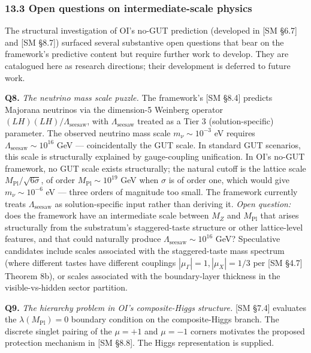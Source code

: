 \documentclass[
]{article}
\begin{document}
\hypertarget{open-questions-on-intermediate-scale-physics}{%
\subsubsection{13.3 Open questions on intermediate-scale
physics}\label{open-questions-on-intermediate-scale-physics}}

The structural investigation of OI's no-GUT prediction (developed in
{[}SM §6.7{]} and {[}SM §8.7{]}) surfaced several substantive open
questions that bear on the framework's predictive content but require
further work to develop. They are catalogued here as research
directions; their development is deferred to future work.

\textbf{Q8.} \emph{The neutrino mass scale puzzle.} The framework's
{[}SM §8.4{]} predicts Majorana neutrinos via the dimension-5 Weinberg
operator \((LH)(LH)/\Lambda_{\mathrm{seesaw}}\), with
\(\Lambda_{\mathrm{seesaw}}\) treated as a Tier 3 (solution-specific)
parameter. The observed neutrino mass scale \(m_\nu \sim 10^{-3}\) eV
requires \(\Lambda_{\mathrm{seesaw}} \sim 10^{16}\) GeV ---
coincidentally the GUT scale. In standard GUT scenarios, this scale is
structurally explained by gauge-coupling unification. In OI's no-GUT
framework, no GUT scale exists structurally; the natural cutoff is the
lattice scale \(M_{\mathrm{Pl}}/\sqrt{6\sigma}\), of order
\(M_{\mathrm{Pl}} \sim 10^{19}\) GeV when \(\sigma\) is of order one,
which would give \(m_\nu \sim 10^{-6}\) eV --- three orders of magnitude
too small. The framework currently treats \(\Lambda_{\mathrm{seesaw}}\)
as solution-specific input rather than deriving it. \emph{Open
question:} does the framework have an intermediate scale between \(M_Z\)
and \(M_{\mathrm{Pl}}\) that arises structurally from the substratum's
staggered-taste structure or other lattice-level features, and that
could naturally produce \(\Lambda_{\mathrm{seesaw}} \sim 10^{16}\) GeV?
Speculative candidates include scales associated with the
staggered-taste mass spectrum (where different tastes have different
couplings \(|\mu_\Gamma| = 1, |\mu_X| = 1/3\) per {[}SM §4.7{]} Theorem
8b), or scales associated with the boundary-layer thickness in the
visible-vs-hidden sector partition.

\textbf{Q9.} \emph{The hierarchy problem in OI's composite-Higgs
structure.} {[}SM §7.4{]} evaluates the \(\lambda(M_{\mathrm{Pl}})=0\)
boundary condition on the composite-Higgs branch. The discrete singlet
pairing of the \(\mu=+1\) and \(\mu=-1\) corners motivates the proposed
protection mechanism in {[}SM §8.8{]}. The Higgs representation is
supplied.
\end{document}
